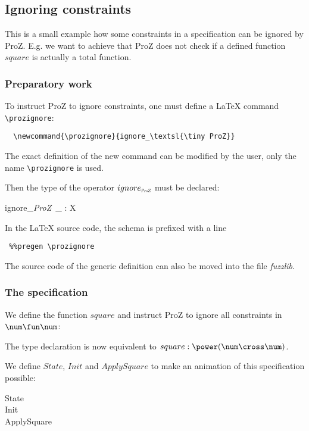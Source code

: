 \documentclass{article}
\begin{document}
\newcommand{\prozignore}{ignore_\textsl{\tiny ProZ}}

\subsection*{Ignoring constraints}


This is a small example how some constraints in a specification can
be ignored by ProZ.
E.g. we want to achieve that ProZ does not check if a defined
function $square$ is actually a total function.

\subsubsection*{Preparatory work}

To instruct ProZ to ignore constraints, one must define a
\LaTeX{} command \verb|\prozignore|:
\begin{verbatim}
  \newcommand{\prozignore}{ignore_\textsl{\tiny ProZ}}
\end{verbatim}
The exact definition of the new command can be modified by
the user, only the name \verb|\prozignore| is used.

Then the type of the operator $\prozignore$ must be declared:
\begin{gendef}[X]
  \prozignore~\_ : \power X
\end{gendef}
In the \LaTeX{} source code, the schema is prefixed with a
line
\begin{verbatim}
 %%pregen \prozignore
\end{verbatim}
The source code of the generic definition can also be moved
into the file \textsl{fuzzlib}.


\subsubsection*{The specification}

We define the function $square$ and instruct ProZ to ignore all
constraints in $\num\fun\num$:
The type declaration is now equivalent to $square : \power(\num\cross\num)$.

We define $State$, $Init$ and $ApplySquare$ to make an animation of
this specification possible:

\begin{zed}
  State \\
  Init \\
  ApplySquare 
\end{zed}
\end{document}
